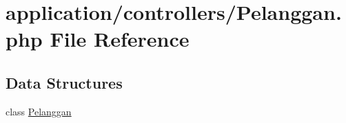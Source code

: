 \hypertarget{_pelanggan_8php}{}\section{application/controllers/\+Pelanggan.php File Reference}
\label{_pelanggan_8php}
\subsection*{Data Structures}
\begin{DoxyCompactItemize}
\item 
class \mbox{\hyperlink{class_pelanggan}{Pelanggan}}
\end{DoxyCompactItemize}

